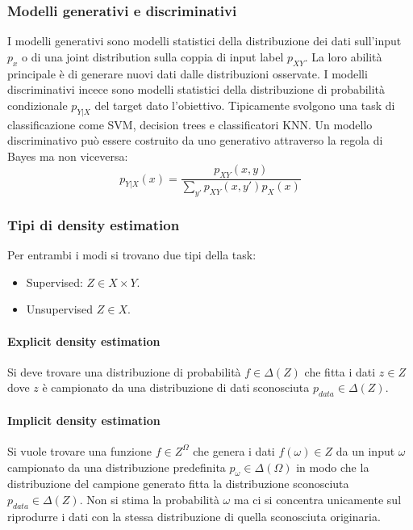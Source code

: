 		\subsubsection{Modelli generativi e discriminativi}
		I modelli generativi sono modelli statistici della distribuzione dei dati sull'input $p_x$ o di una joint distribution sulla coppia di input label $p_{XY}$.
		La loro abilit\`a principale \`e di generare nuovi dati dalle distribuzioni osservate.
		I modelli discriminativi incece sono modelli statistici della distribuzione di probabilit\`a condizionale $p_{Y|X}$ del target dato l'obiettivo.
		Tipicamente svolgono una task di classificazione come SVM, decision trees e classificatori KNN.
		Un modello discriminativo pu\`o essere costruito da uno generativo attraverso la regola di Bayes ma non viceversa:
		$$p_{Y|X}(x) = \dfrac{p_{XY}(x,y)}{\sum\limits_{y'}p_{XY}(x,y')p_X(x)}$$

		\subsubsection{Tipi di density estimation}
		Per entrambi i modi si trovano due tipi della task:
		\begin{itemize}
			\item Supervised: $Z\in X\times Y$.
			\item Unsupervised $Z\in X$.
		\end{itemize}

			\paragraph{Explicit density estimation}
			Si deve trovare una distribuzione di probabilit\`a $f\in \Delta(Z)$ che fitta i dati $z\in Z$ dove $z$ \`e campionato da una distribuzione di dati sconosciuta $p_{data}\in\Delta(Z)$.

			\paragraph{Implicit density estimation}
			Si vuole trovare una funzione $f\in Z^\Omega$ che genera i dati $f(\omega)\in Z$ da un input $\omega$ campionato da una distribuzione predefinita $p_\omega\in\Delta(\Omega)$ in modo che la distribuzione del campione generato fitta la distribuzione sconosciuta $p_{data}\in\Delta(Z)$.
			Non si stima la probabilit\`a $\omega$ ma ci si concentra unicamente sul riprodurre i dati con la stessa distribuzione di quella sconosciuta originaria.

